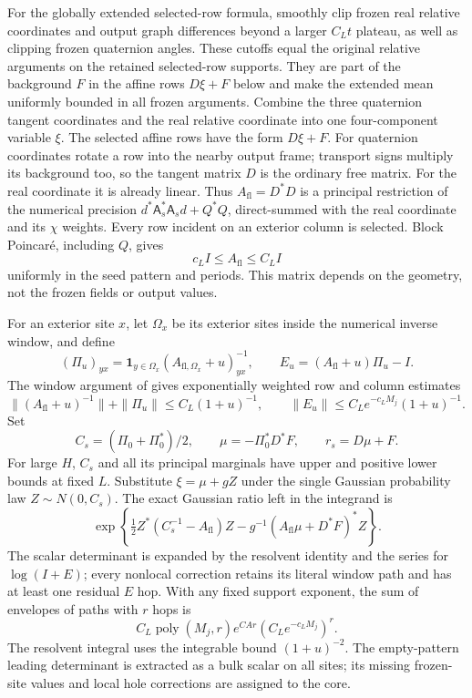 For the globally extended selected-row formula, smoothly clip frozen
real relative coordinates and output graph differences beyond a larger
$C_Lt$ plateau, as well as clipping frozen quaternion angles.  These
cutoffs equal the original relative arguments on the retained selected-row
supports.  They are part of the background $F$ in the affine rows
$D\xi+F$ below and make the extended mean uniformly bounded in all
frozen arguments.
Combine the three quaternion tangent coordinates and the real
relative coordinate into one four-component variable $\xi$.
The selected affine rows have the form $D\xi+F$.  For quaternion
coordinates rotate a row into the nearby output frame; transport signs
multiply its background too, so the tangent matrix $D$ is the ordinary
free matrix.  For the real coordinate it is already linear.  Thus
$A_{\mathrm{fl}}=D^*D$ is a principal restriction of the numerical precision
$d^*\mathsf A_s^*\mathsf A_sd+Q^*Q$, direct-summed with the real
coordinate and its $\chi$ weights.  Every row incident on an exterior
column is selected.  Block Poincar\'e, including $Q$, gives
\[
                 c_LI\le A_{\mathrm{fl}}\le C_LI
\]
uniformly in the seed pattern and periods.  This matrix depends on the
geometry, not the frozen fields or output values.

For an exterior site $x$, let $\Omega_x$ be its exterior sites inside
the numerical inverse window, and define
\[
 (\Pi_u)_{yx}=\mathbf1_{y\in\Omega_x}
               (A_{{\mathrm{fl}},\Omega_x}+u)^{-1}_{yx},\qquad
 E_u=(A_{\mathrm{fl}}+u)\Pi_u-I.
\]
The window argument of
\cite[Section ``The energy identity and the massive Gaussian'',
window bounds and ratio-series identities]{SharpO4} gives exponentially
weighted row and column estimates
\[
 \|(A_{\mathrm{fl}}+u)^{-1}\|+\|\Pi_u\|\le C_L(1+u)^{-1},\qquad
 \|E_u\|\le C_Le^{-c_LM_j}(1+u)^{-1}.
\]
Set
\[
 C_s=(\Pi_0+\Pi_0^*)/2,\qquad
 \mu=-\Pi_0^*D^*F,\qquad r_s=D\mu+F.
\]
For large $H$, $C_s$ and all its principal marginals have upper and
positive lower bounds at fixed $L$.  Substitute $\xi=\mu+gZ$ under the
single Gaussian probability law $Z\sim N(0,C_s)$.  The exact Gaussian
ratio left in the integrand is
\[
 \exp\!\left\{\tfrac12Z^*(C_s^{-1}-A_{\mathrm{fl}})Z
       -g^{-1}(A_{\mathrm{fl}}\mu+D^*F)^*Z\right\}.
\]
The scalar determinant is expanded by the resolvent identity and the
series for $\log(I+E)$; every nonlocal correction retains its literal
window path and has at least one residual $E$ hop.  With any fixed
support exponent, the sum of envelopes of paths with $r$ hops is
\[
 C_L\operatorname{poly}(M_j,r)e^{CAr}
                          (C_Le^{-c_LM_j})^r.
\]
The resolvent integral uses the integrable bound $(1+u)^{-2}$.  The
empty-pattern leading determinant is extracted as a bulk scalar on
all sites; its missing frozen-site values and local hole corrections
are assigned to the core.


